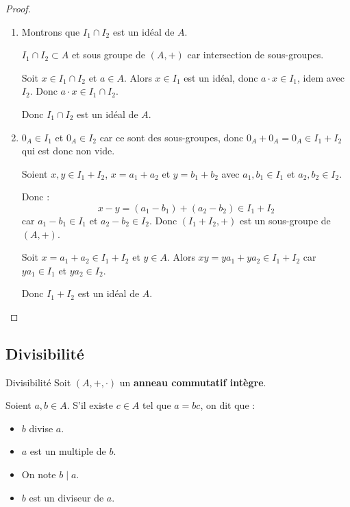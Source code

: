 \begin{proof}~

\begin{enumerate}
    \item Montrons que $I_1 \cap I_2$ est un idéal de $A$.

    $I_1 \cap I_2 \subset A$ et sous groupe de $(A, +)$ car intersection de sous-groupes.

    Soit $x \in I_1 \cap I_2$ et $a \in A$. Alors $x \in I_1$ est un idéal, donc $a \cdot x \in I_1$, 
    idem avec $I_2$. Donc $a \cdot x \in I_1 \cap I_2$.

    Donc $I_1 \cap I_2$ est un idéal de $A$.
    
    \item $0_A \in I_1$ et $0_A \in I_2$ car ce sont des sous-groupes, donc $0_A  + 0_A = 0_A \in I_1 + I_2$
    qui est donc non vide.

    Soient $x, y \in I_1 + I_2$, $x = a_1 + a_2$ et $y = b_1 + b_2$ avec $a_1, b_1 \in I_1$ et $a_2, b_2 \in I_2$.

    Donc : \[x - y = (a_1 - b_1) + (a_2 - b_2) \in I_1 + I_2\]
    car $a_1 - b_1 \in I_1$ et $a_2 - b_2 \in I_2$.
    Donc $(I_1 + I_2, +)$ est un sous-groupe de $(A, +)$.

    Soit $x = a_1 + a_2 \in I_1 + I_2$ et $y \in A$. Alors 
    $xy = y a_1 + y a_2 \in I_1 + I_2$ car $y a_1 \in I_1$ et $y a_2 \in I_2$.

    Donc $I_1 + I_2$ est un idéal de $A$.
\end{enumerate}
\end{proof}

\subsection{Divisibilité}


\begin{definition}{Divisibilité}{}
    Soit $(A, +, \cdot)$ un \textbf{anneau commutatif intègre}. 

    Soient $a, b \in A$. S'il existe $c \in A$ tel que $a = bc$, on dit que : 
    \begin{itemize}
        \item $b$ divise $a$.
        \item $a$ est un multiple de $b$.
        \item On note $b \mid a$.
        \item $b$ est un diviseur de $a$.
    \end{itemize}
\end{definition}

